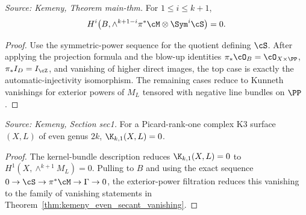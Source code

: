 \begin{theorem}
  \label{thm:kemeny_even_secant_vanishing}
  \textit{Source: Kemeny, Theorem main-thm.}
  For \(1\le i\le k+1\),
  \[
    H^i\bigl(B,\wedge^{k+1-i}\pi^*\cM\otimes\Sym^i\cS\bigr)=0 .
  \]
\end{theorem}
\begin{proof}
  Use the symmetric-power sequence for the quotient defining \(\cS\).  After
  applying the projection formula and the blow-up identities
  \(\pi_*\cO_B=\cO_{X\times\PP}\), \(\pi_*I_D=I_{\cZ}\), and vanishing of higher
  direct images, the top case is exactly the automatic-injectivity isomorphism.
  The remaining cases reduce to Kunneth vanishings for exterior powers of
  \(M_L\) tensored with negative line bundles on \(\PP\).
\end{proof}

\begin{theorem}
  \label{thm:kemeny_even_voisin}
  \textit{Source: Kemeny, Section sec1.}
  For a Picard-rank-one complex K3 surface \((X,L)\) of even genus \(2k\),
  \(\K_{k,1}(X,L)=0\).
\end{theorem}
\begin{proof}
  The kernel-bundle description reduces \(\K_{k,1}(X,L)=0\) to
  \(H^1(X,\wedge^{k+1}M_L)=0\).  Pulling to \(B\) and using the exact sequence
  \(0\to\cS\to\pi^*\cM\to\Gamma\to0\), the exterior-power filtration reduces
  this vanishing to the family of vanishing statements in
  Theorem~\ref{thm:kemeny_even_secant_vanishing}.
\end{proof}

